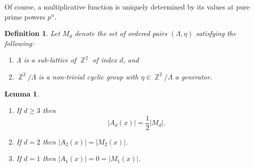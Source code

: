 \documentclass[reqno, 11pt]{amsart}
\newtheorem{lemma}[theorem]{Lemma}
\newtheorem{definition}[theorem]{Definition}
\DeclareMathOperator{\Z}{\mathbb{Z}}
\begin{document}
Of course, a multiplicative function is uniquely determined by its values at pure prime powers $p^{n}$.

\begin{definition}
\label{definition:markedcoke}
    Let $M_{d}$ denote the set of ordered pairs $(\Lambda,\eta)$ satisfying the following: 
    \begin{enumerate}
        \item $\Lambda$ is a sub-lattice of $\Z^{2}$ of index $d$, and
        \item $\Z^{2}/\Lambda$ is a non-trivial cyclic group with $\eta \in \Z^{2}/\Lambda$ a generator.
    \end{enumerate}
\end{definition} 

\begin{lemma}
    \label{lemma:countAd} 
    \begin{enumerate}
    \item If $d \geq 3$ then \[|A_{d}(x)| = \frac{1}{2}|M_{d}|.\]
    \item If $d=2$ then $|A_{2}(x)| = |M_{2}(x)|$.  
    \item If $d=1$ then $|A_{1}(x)| = 0 = |M_{1}(x)|$.
    \end{enumerate}
\end{lemma}
\end{document}
